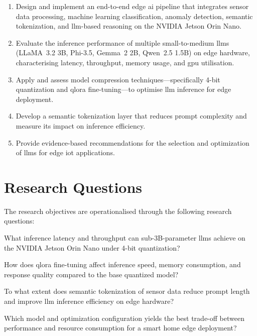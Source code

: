 \documentclass[12pt,a4paper,oneside]{report}
\begin{document}
\begin{enumerate}[label=\textbf{O\arabic*.}]
    \item Design and implement an end-to-end edge \gls{ai} pipeline that integrates sensor data processing, machine learning classification, anomaly detection, semantic tokenization, and \gls{llm}-based reasoning on the NVIDIA Jetson Orin Nano.
    \item Evaluate the inference performance of multiple small-to-medium \glspl{llm} (LLaMA~3.2 3B, Phi-3.5, Gemma~2 2B, Qwen~2.5 1.5B) on edge hardware, characterising latency, throughput, memory usage, and \gls{gpu} utilisation.
    \item Apply and assess model compression techniques---specifically 4-bit quantization and \gls{qlora} fine-tuning---to optimise \gls{llm} inference for edge deployment.
    \item Develop a semantic tokenization layer that reduces prompt complexity and measure its impact on inference efficiency.
    \item Provide evidence-based recommendations for the selection and optimization of \glspl{llm} for edge \gls{iot} applications.
\end{enumerate}


\section{Research Questions}
\label{sec:intro-rqs}

The research objectives are operationalised through the following research questions:

\begin{description}[style=nextline,leftmargin=1.2cm]
    \item[\textbf{RQ1.}] What inference latency and throughput can sub-3B-parameter \glspl{llm} achieve on the NVIDIA Jetson Orin Nano under 4-bit quantization?
    \item[\textbf{RQ2.}] How does \gls{qlora} fine-tuning affect inference speed, memory consumption, and response quality compared to the base quantized model?
    \item[\textbf{RQ3.}] To what extent does semantic tokenization of sensor data reduce prompt length and improve \gls{llm} inference efficiency on edge hardware?
    \item[\textbf{RQ4.}] Which model and optimization configuration yields the best trade-off between performance and resource consumption for a smart home edge deployment?
\end{description}
\end{document}
